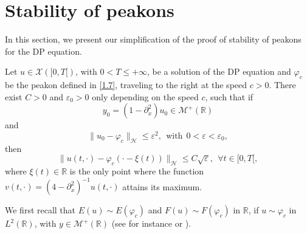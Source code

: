 \documentclass[10pt,a4paper,twoside]{article}
\begin{document}
\section{Stability of peakons}\label{Section 3a}
In this section, we present our simplification of the proof of stability of peakons for the DP equation.



\begin{Theo}\label{Theorem P}
Let $u\in \mathcal{X}([0,T[)$, with $0<T\le+\infty$, be a solution of the DP equation and 
$\varphi_{c}$ be the peakon defined in \eqref{1.7}, traveling to the right at the speed $c>0$. There exist $C>0$ and $\varepsilon_{0}>0$ only depending on the speed $c$, such that if
\begin{equation}
y_{0}=(1-\partial^{2}_{x})u_{0}\in\mathcal{M}^{+}(\mathbb{R})
\label{P1}
\end{equation}
and
\begin{equation}
\|u_{0}-\varphi_{c}\|_{\mathcal{H}}\le\varepsilon^{2},~~\text{with}~~0<\varepsilon<\varepsilon_{0},
\label{P2}
\end{equation}
then 
\begin{equation}
\|u(t,\cdot)-\varphi_{c}(\cdot-\xi(t))\|_{\mathcal{H}}\le C\sqrt{\varepsilon},~~\forall t\in[0,T[,
\label{P3}
\end{equation}
where $\xi(t)\in\mathbb{R}$ is the only point where the function 
$v(t,\cdot)=(4-\partial^{2}_{x})^{-1}u(t,\cdot)$ attains its maximum.
\end{Theo}


We first  recall that $E(u)\sim E(\varphi_{c})$ and $F(u)\sim F(\varphi_{c})$ in $\mathbb{R}$, if 
$u\sim\varphi_{c}$ in $L^{2}(\mathbb{R})$, with $y\in\mathcal{M}^{+}(\mathbb{R})$
(see for instance \cite{MR2460268} or \cite{AK}).
\end{document}
